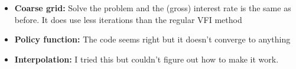 \documentclass[12pt]{article}%
\begin{document}
\begin{enumerate}
	\begin{itemize}
		\item \textbf{Coarse grid:} Solve the problem and the (gross) interest rate is the same as before. It does use less iterations than the regular VFI method
		\item \textbf{Policy function:} The code seems right but it doesn't converge to anything
		\item  \textbf{Interpolation:} I tried this but couldn't figure out how to make it work. 
	\end{itemize}
	
	
\end{enumerate}

\strut

\onehalfspacing
\end{document}

